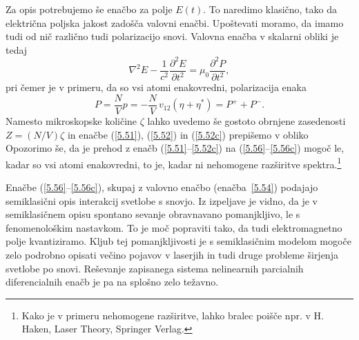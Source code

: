 Za opis potrebujemo še enačbo za polje $E(t)$. To naredimo klasično, tako da
električna poljska jakost zadošča valovni enačbi. Upoštevati moramo, 
da imamo tudi od nič različno tudi polarizacijo snovi. 
Valovna enačba v skalarni obliki je tedaj
\begin{equation}  
\label{5.54}
\nabla^2 E-\frac{1}{c^2}\frac{\partial^2 E}{\partial t^2}=\mu_0 \frac{\partial^2 P}{\partial t^2},
\end{equation}
pri čemer je v primeru, da so vsi atomi enakovredni, polarizacija enaka
\begin{equation}  
\label{5.53}
P=\frac{N}{V}p = -\frac{N}{V}\,v_{12}\left(\eta+\eta^{\ast}\right)=P^+ + P^-.
\end{equation}
Namesto mikroskopske količine $\zeta$ lahko uvedemo še gostoto obrnjene
zasedenosti $Z=(N/V)\zeta$ in enačbe (\ref{5.51}), (\ref{5.52}) in (\ref{5.52c})
prepišemo v obliko 
Opozorimo še, da je prehod z enačb (\ref{5.51}--\ref{5.52c}) na (\ref{5.56}--\ref{5.56c}) 
mogoč le, kadar so vsi atomi enakovredni, to je, kadar ni nehomogene razširitve 
spektra.\footnote{Kako je v primeru nehomogene razširitve, lahko bralec poišče npr. v 
H. Haken,  Laser Theory, Springer Verlag.}

Enačbe (\ref{5.56}--\ref{5.56c}), skupaj z valovno enačbo (enačba~\ref{5.54}) podajajo
semiklasični opis interakcij svetlobe s snovjo. Iz izpeljave je vidno, da
je v semiklasičnem opisu spontano sevanje obravnavano pomanjkljivo, le s fenomenološkim
nastavkom. To je moč popraviti tako, da tudi elektromagnetno polje kvantiziramo. 
Kljub tej pomanjkljivosti je s semiklasičnim modelom mogoče zelo podrobno opisati 
večino pojavov v laserjih in tudi druge probleme širjenja svetlobe po snovi. 
Reševanje zapisanega sistema nelinearnih parcialnih diferencialnih enačb je pa 
na splošno zelo težavno.


